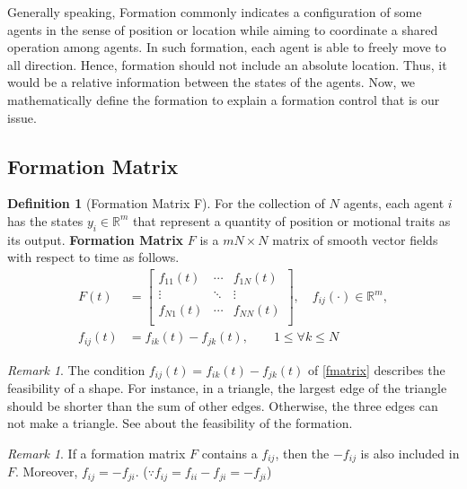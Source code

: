 \documentclass[11pt, a4paper, oneside, openany, reqno]{book}
\theoremstyle{definition}
\newtheorem{definition}[theorem]{Definition}
\theoremstyle{remark}
\newtheorem{remark}[theorem]{Remark}
\numberwithin{equation}{chapter} %
\newcommand{\R}{\ensuremath{{\mathbb R}}}
\begin{document}
Generally speaking, Formation commonly indicates a configuration of some agents
in the sense of position or location while aiming to coordinate a shared operation among agents.
In such formation, each agent is able to freely move to all direction. 
Hence, formation should not include an absolute location.
Thus, it would be a relative information between the states of the agents.
Now, we mathematically define the formation to explain a formation control that is our issue.

\subsection{Formation Matrix}

\begin{definition}[Formation Matrix F]
	For the collection of $ N $ agents, each agent $ i $ has the states $ y_i \in \R^m$
	that represent a quantity of position or motional traits as its output.
	\textbf{Formation Matrix} $ F $ is a $ mN \times N $ matrix of smooth vector fields
	with respect to time as follows.
	\begin{equation}\begin{split}\label{fmatrix}
		F(t) &= \left[ \begin{array}{ccc} f_{11}(t) & \cdots & f_{1N}(t) \\
		\vdots & \ddots & \vdots \\
		f_{N1}(t) & \cdots & f_{NN}(t) \\ 	\end{array} \right], \quad f_{ij}(\cdot) \in \R^m , \\
		f_{ij}(t) &= f_{ik}(t) - f_{jk}(t), \quad 
		\quad 1 \leq \forall k \leq N
	\end{split}\end{equation}
\end{definition}

\begin{remark}
	The condition $ f_{ij}(t) = f_{ik}(t) - f_{jk}(t) $ of \eqref{fmatrix} describes 
	the feasibility of a shape. For instance, in a triangle, 
	the largest edge of the triangle should be shorter than the sum of other edges.
	Otherwise, the three edges can not make a triangle.
	See \cite{feasible} about the feasibility of the formation.
\end{remark}

\begin{remark}
	If a formation matrix $ F $ contains a $ f_{ij} $, 
	then the $ -f_{ij} $ is also included in $ F $.	
	Moreover, $ f_{ij} = -f_{ji} $. ($ \because f_{ij} = f_{ii}-f_{ji} = -f_{ji} $)
\end{remark}
\end{document}
